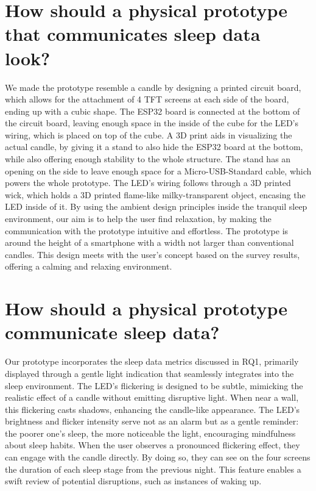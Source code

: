 \documentclass[
  a4paper,  %
  twoside,  %
  bibliography=totoc,
  headsepline,
  cleardoublepage=empty,
  parskip=half,
  draft=false
]{scrbook}
\begin{document}
\section{How should a physical prototype that communicates sleep data look?}
We made the prototype resemble a candle by designing a printed circuit board, which allows for the attachment of 4 TFT screens at each side of the board, ending up with a cubic shape. The ESP32 board is connected at the bottom of the circuit board, leaving enough space in the inside of the cube for the LED's wiring, which is placed on top of the cube. A 3D print aids in visualizing the actual candle, by giving it a stand to also hide the ESP32 board at the bottom, while also offering enough stability to the whole structure. The stand has an opening on the side to leave enough space for a Micro-USB-Standard cable, which powers the whole prototype. The LED's wiring follows through a 3D printed wick, which holds a 3D printed flame-like milky-transparent object, encasing the LED inside of it. By using the ambient design principles inside the tranquil sleep environment, our aim is to help the user find relaxation, by making the communication with the prototype intuitive and effortless. The prototype is around the height of a smartphone with a width not larger than conventional candles. This design meets with the user's concept based on the survey results, offering a calming and relaxing environment.

\section{How should a physical prototype communicate sleep data?}
Our prototype incorporates the sleep data metrics discussed in RQ1, primarily displayed through a gentle light indication that seamlessly integrates into the sleep environment. The LED's flickering is designed to be subtle, mimicking the realistic effect of a candle without emitting disruptive light. When near a wall, this flickering casts shadows, enhancing the candle-like appearance. The LED's brightness and flicker intensity serve not as an alarm but as a gentle reminder: the poorer one's sleep, the more noticeable the light, encouraging mindfulness about sleep habits. When the user observes a pronounced flickering effect, they can engage with the candle directly. By doing so, they can see on the four screens the duration of each sleep stage from the previous night. This feature enables a swift review of potential disruptions, such as instances of waking up.
\end{document}
